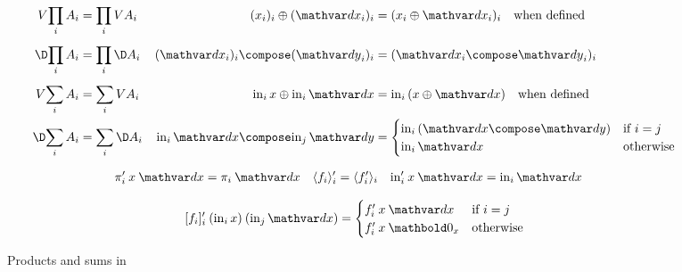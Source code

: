 \begin{figure*}
  \begin{align*}
    \vals{\prod_{i} A_i} &= \prod_{i} \vals A_i &
    (x_i)_i \upd (\dx_i)_i &= (x_i \upd \dx_i)_i
    \quad\text{when defined}
    \\[1ex]
    \chgs{\prod_{i} A_i} &= \prod_{i} \chgs A_i &
    (\dx_i)_i \compose (\dy_i)_i &= (\dx_i \compose \dy_i)_i
    \\[1ex]
    \vals{\sum_{i} A_i} &= \sum_{i} \vals A_i &
    \inj i x \upd \inj i \dx &= \inj i (x \upd \dx) \quad\text{when defined}
    \\
    \chgs{\sum_{i} A_i} &= \sum_{i} \chgs A_i &
    \inj i \dx \compose \inj j \dy &= 
    \begin{cases}
      \inj i (\dx \compose \dy) & \text{if}~i=j\\
      \inj i \dx & \text{otherwise}
    \end{cases}
  \end{align*}

  \begin{align*}
    \deriv\pi_i \<x \<\dx &= \pi_i\<\dx &
    \deriv{\fork{f_i}_i} &= \fork{\deriv f_i}_i &
    \deriv\injc_i \<x \<\dx &= \inj i \dx
  \end{align*}

  \begin{equation*}
    \deriv{\krof{f_i}_i} \<(\inj i x) \<(\inj j \dx)
    =
    \begin{cases}
      \deriv f_i \<x \<\dx & \text{if}~i = j\\
      \deriv f_i \<x \<\zero_x & \text{otherwise}
    \end{cases}
  \end{equation*}
  \vspace{-1em}

  \caption{Products and sums in \CP}
  \label{fig:CP-cartesian}
\end{figure*}
